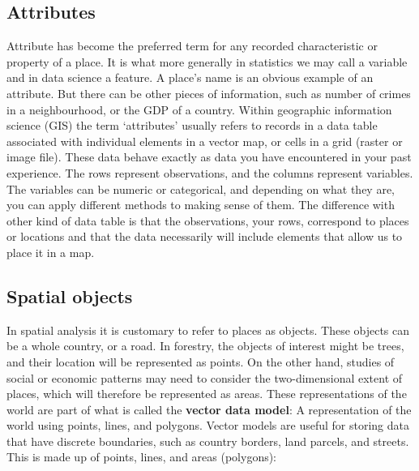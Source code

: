 \documentclass[
]{book}
\begin{document}
\hypertarget{attributes}{%
\subsection{Attributes}\label{attributes}}

Attribute has become the preferred term for any recorded characteristic or property of a place. It is what more generally in statistics we may call a variable and in data science a feature. A place's name is an obvious example of an attribute. But there can be other pieces of information, such as number of crimes in a neighbourhood, or the GDP of a country. Within geographic information science (GIS) the term `attributes' usually refers to records in a data table associated with individual elements in a vector map, or cells in a grid (raster or image file). These data behave exactly as data you have encountered in your past experience. The rows represent observations, and the columns represent variables. The variables can be numeric or categorical, and depending on what they are, you can apply different methods to making sense of them. The difference with other kind of data table is that the observations, your rows, correspond to places or locations and that the data necessarily will include elements that allow us to place it in a map.

\hypertarget{spatial-objects}{%
\subsection{Spatial objects}\label{spatial-objects}}

In spatial analysis it is customary to refer to places as objects. These objects can be a whole country, or a road. In forestry, the objects of interest might be trees, and their location will be represented as points. On the other hand, studies of social or economic patterns may need to consider the two-dimensional extent of places, which will therefore be represented as areas. These representations of the world are part of what is called the \textbf{vector data model}: A representation of the world using points, lines, and polygons. Vector models are useful for storing data that have discrete boundaries, such as country borders, land parcels, and streets. This is made up of points, lines, and areas (polygons):
\end{document}
